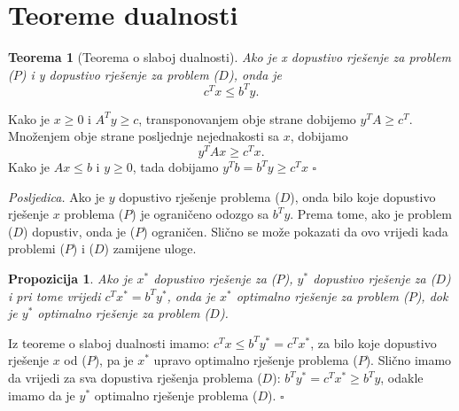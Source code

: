 \documentclass[a4paper, utf8, 11pt, colorlinks]{book}
\newtheorem{thm}{Teorema}
\newtheorem{prop}{Propozicija}
\newenvironment{proof}{{Dokaz:}}{\hfill$\square$}
\begin{document}
\section{Teoreme dualnosti}

\begin{thm}[Teorema o slaboj dualnosti]
  Ako je x dopustivo rješenje za problem ($P$) i y dopustivo rješenje za problem  ($D$), onda je 
  $$ c^T x \leq b^T y.$$
\end{thm}
\begin{proof}
         Kako je $x \geq 0$ i $A^T y \geq c $,  transponovanjem obje strane dobijemo 
         $y^T A \geq c^T$. Množenjem obje strane posljednje nejednakosti sa $x$, dobijamo 
         $$y^TAx \geq c^T x.$$ Kako je $Ax \leq b$ i $y \geq 0$,  tada dobijamo 
         $ y^T b = b^T y  \geq c^T x$
\end{proof}

\emph{Posljedica.} Ako je $y$ dopustivo rješenje problema  ($D$),  onda bilo koje dopustivo rješenje $x$ problema ($P$) je ograničeno odozgo sa $b^T y$. Prema tome, ako je problem ($D$) dopustiv, onda je ($P$) ograničen. Slično se može pokazati da ovo vrijedi kada problemi ($P$) i ($D$) zamijene uloge.

\begin{prop}  
    Ako je $x^*$ dopustivo rješenje za  ($P$), $y^*$ dopustivo rješenje za ($D$) i pri tome vrijedi 
    $c^T x^* = b^T y^*$, onda je $x^*$ optimalno rješenje za problem  ($P$), dok je $y^*$ optimalno rješenje za problem  ($D$).  
\end{prop}
\begin{proof}
         Iz teoreme o slaboj dualnosti imamo: $c^T x  \leq b^T y^* = c^T x^*$, za bilo koje dopustivo rješenje $x$ od  ($P$), pa je $x^*$ upravo optimalno rješenje problema  ($P$).
         Slično imamo da vrijedi za sva dopustiva rješenja problema ($D$): $b^T y^* = c^T x^* \geq b^T y$, odakle imamo da je $y^*$ optimalno rješenje problema  ($D$). 
\end{proof}
\end{document}
